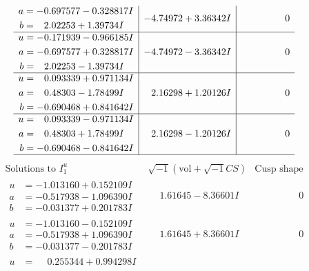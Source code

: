 \documentclass[1p]{elsarticle_modified}
\theoremstyle{definition}
\newcommand{\I}{\sqrt{-1}}
\begin{document}
$$\begin{array}{c|c|c}
\begin{aligned}
a &= -0.697577 - 0.328817 I \\
b &= \phantom{-}2.02253 + 1.39734 I\end{aligned}
 & -4.74972 + 3.36342 I & \phantom{-0.000000 } 0 \\ \hline\begin{aligned}
u &= -0.171939 - 0.966185 I \\
a &= -0.697577 + 0.328817 I \\
b &= \phantom{-}2.02253 - 1.39734 I\end{aligned}
 & -4.74972 - 3.36342 I & \phantom{-0.000000 } 0 \\ \hline\begin{aligned}
u &= \phantom{-}0.093339 + 0.971134 I \\
a &= \phantom{-}0.48303 - 1.78499 I \\
b &= -0.690468 + 0.841642 I\end{aligned}
 & \phantom{-}2.16298 + 1.20126 I & \phantom{-0.000000 } 0 \\ \hline\begin{aligned}
u &= \phantom{-}0.093339 - 0.971134 I \\
a &= \phantom{-}0.48303 + 1.78499 I \\
b &= -0.690468 - 0.841642 I\end{aligned}
 & \phantom{-}2.16298 - 1.20126 I & \phantom{-0.000000 } 0\\
 \hline 
 \end{array}$$\newpage$$\begin{array}{c|c|c}  
\text{Solutions to }I^u_{1}& \I (\text{vol} + \sqrt{-1}CS) & \text{Cusp shape}\\
 \hline 
\begin{aligned}
u &= -1.013160 + 0.152109 I \\
a &= -0.517938 - 1.096390 I \\
b &= -0.031377 + 0.201783 I\end{aligned}
 & \phantom{-}1.61645 - 8.36601 I & \phantom{-0.000000 } 0 \\ \hline\begin{aligned}
u &= -1.013160 - 0.152109 I \\
a &= -0.517938 + 1.096390 I \\
b &= -0.031377 - 0.201783 I\end{aligned}
 & \phantom{-}1.61645 + 8.36601 I & \phantom{-0.000000 } 0 \\ \hline\begin{aligned}
u &= \phantom{-}0.255344 + 0.994298 I \\

\end{aligned}
\end{array}$$
\end{document}
